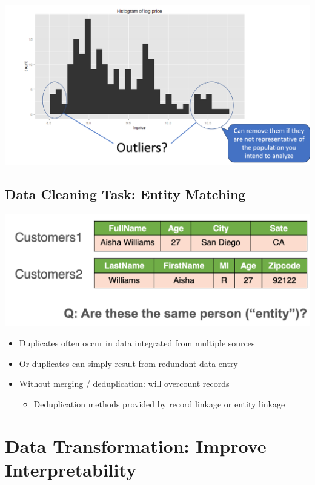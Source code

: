 \documentclass[11pt]{article}
\theoremstyle{definition}
\begin{document}
\includegraphics[width=\textwidth]{16.png}
\subsection{Data Cleaning Task: Entity Matching}
\includegraphics[width=\textwidth]{17.png}
\begin{itemize}
    \item Duplicates often occur in data integrated from multiple sources
    \item Or duplicates can simply result from redundant data entry
    \item Without merging / deduplication: will overcount records
    \begin{itemize}
        \item Deduplication methods provided by record linkage or entity linkage
    \end{itemize}
\end{itemize}
\section{Data Transformation:
Improve Interpretability}
\end{document}
